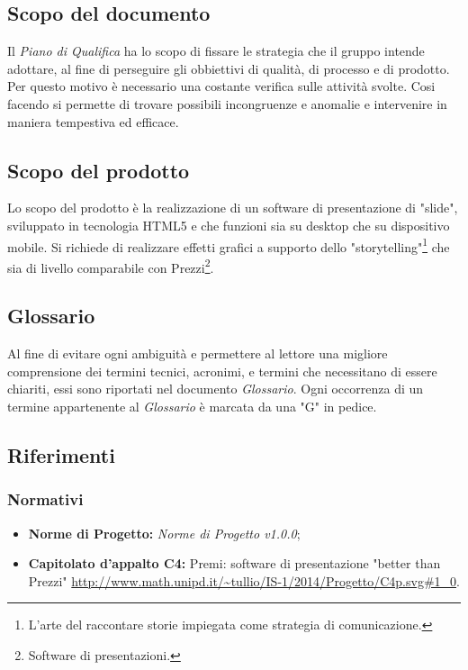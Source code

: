 \subsection{Scopo del documento}
Il \textit{Piano di Qualifica} ha lo scopo di fissare le strategia che il gruppo intende adottare, al fine di perseguire gli obbiettivi di qualità, di processo e di prodotto. Per questo motivo è necessario una costante verifica sulle attività svolte. Cosi facendo si permette di trovare possibili incongruenze e anomalie e intervenire in maniera tempestiva ed efficace.
\subsection{Scopo del prodotto}
Lo scopo del prodotto è la realizzazione di un software di presentazione di "slide", sviluppato in tecnologia HTML5 e che funzioni sia su desktop che su dispositivo mobile. Si richiede di realizzare effetti grafici a supporto dello "storytelling"\footnote{L'arte del raccontare storie impiegata come strategia di comunicazione.} che sia di livello comparabile con Prezzi\footnote{Software di presentazioni.}.
\subsection{Glossario}
Al fine di evitare ogni ambiguità e permettere al lettore una migliore comprensione dei termini tecnici, acronimi, e termini che necessitano di essere chiariti,  essi sono riportati nel documento \textit{Glossario}. 
Ogni occorrenza  di un termine appartenente al \textit{Glossario} è marcata da una "G" in pedice.
\subsection{Riferimenti}
	\subsubsection{Normativi}
	\begin{itemize}
		\item \textbf{Norme di Progetto:} \textit{Norme di Progetto v1.0.0};
		\item \textbf{Capitolato d'appalto C4:} Premi: software di presentazione "better than Prezzi" \url{http://www.math.unipd.it/~tullio/IS-1/2014/Progetto/C4p.svg#1_0}.
	\end{itemize}
